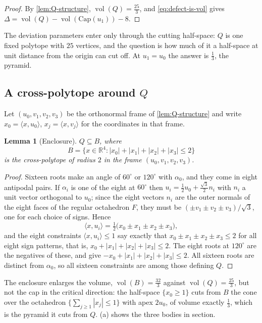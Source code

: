 \documentclass[11pt,reqno]{amsart}
\renewcommand{\_}{\origunderscore\allowbreak}
\numberwithin{equation}{section}
\theoremstyle{plain}
\newtheorem{lem}[thm]{Lemma}
\theoremstyle{definition}
\theoremstyle{remark}
\newcommand{\defect}{\Delta}                 %
\newcommand{\base}{u}                        %
\newcommand{\capQ}{\mathrm{Cap}}             %
\DeclareMathOperator{\vol}{vol}
\begin{document}
\begin{proof}
By \cref{lem:Q-structure}, $\vol(Q)=\tfrac{25}{3}$, and
\cref{eq:defect-is-vol} gives $\defect=\vol(Q)-\vol(\capQ(\base_1))-8$.
\end{proof}

The deviation parameters enter only through the cutting half-space: $Q$
is one fixed polytope with $25$ vertices, and the
question is how much of it a half-space at unit distance from the origin
can cut off. At $\base_1=\base_0$ the answer is $\tfrac13$, the pyramid.

\subsection{A cross-polytope around \texorpdfstring{$Q$}{Q}}\label{sec:crosspolytope}

Let $(\base_0,v_1,v_2,v_3)$ be the orthonormal frame of
\cref{lem:Q-structure} and write $x_0=\langle x,\base_0\rangle$,
$x_j=\langle x,v_j\rangle$ for the coordinates in that frame.

\begin{lem}[Enclosure]\label{lem:crosspolytope}
$Q\subseteq B$, where
\[
  B=\bigl\{x\in\mathbb{R}^4 : |x_0|+|x_1|+|x_2|+|x_3|\le2\bigr\}
\]
is the cross-polytope of radius $2$ in the frame
$(\base_0,v_1,v_2,v_3)$.
\end{lem}

\begin{proof}
Sixteen roots make an angle of $60^\circ$ or $120^\circ$ with $\alpha_0$,
and they come in eight antipodal pairs. If $\alpha_i$ is one of the eight
at $60^\circ$ then $\base_i=\tfrac12\base_0+\tfrac{\sqrt3}{2}n_i$ with
$n_i$ a unit vector orthogonal to $\base_0$; since the eight vectors $n_i$
are the outer normals of the eight faces of the regular octahedron $F$,
they must be $(\pm v_1\pm v_2\pm v_3)/\sqrt3$, one for each choice of
signs.
Hence
\[
  \langle x,\base_i\rangle
  =\tfrac12\bigl(x_0\pm x_1\pm x_2\pm x_3\bigr),
\]
and the eight constraints $\langle x,\base_i\rangle\le1$ say exactly that
$x_0\pm x_1\pm x_2\pm x_3\le2$ for all eight sign patterns, that is,
$x_0+|x_1|+|x_2|+|x_3|\le2$. The eight roots at $120^\circ$ are the
negatives of these, and give $-x_0+|x_1|+|x_2|+|x_3|\le2$. All sixteen
roots are distinct from $\alpha_0$, so all sixteen constraints are among
those defining $Q$.
\end{proof}

The enclosure enlarges the volume, $\vol(B)=\tfrac{32}{3}$ against
$\vol(Q)=\tfrac{25}{3}$, but not the cap in the critical direction: the
half-space $\{x_0\ge1\}$ cuts from $B$ the cone over the octahedron
$\{\sum_{j\ge1}|x_j|\le1\}$ with apex $2\base_0$, of volume exactly
$\tfrac13$, which is the pyramid it cuts from $Q$. (a) shows the three bodies in section.
\end{document}
